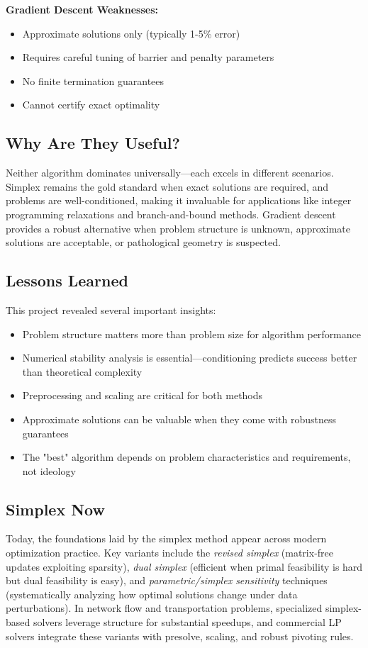 \documentclass[11pt]{article}
\begin{document}
\textbf{Gradient Descent Weaknesses:}
\begin{itemize}
    \item Approximate solutions only (typically 1-5\% error)
    \item Requires careful tuning of barrier and penalty parameters
    \item No finite termination guarantees
    \item Cannot certify exact optimality
\end{itemize}

\subsection{Why Are They Useful?}
Neither algorithm dominates universally—each excels in different scenarios. Simplex remains the gold standard when exact solutions are required, and problems are well-conditioned, making it invaluable for applications like integer programming relaxations and branch-and-bound methods. Gradient descent provides a robust alternative when problem structure is unknown, approximate solutions are acceptable, or pathological geometry is suspected.



\subsection{Lessons Learned}
This project revealed several important insights:
\begin{itemize}
    \item Problem structure matters more than problem size for algorithm performance
    \item Numerical stability analysis is essential—conditioning predicts success better than theoretical complexity
    \item Preprocessing and scaling are critical for both methods
    \item Approximate solutions can be valuable when they come with robustness guarantees
    \item The "best" algorithm depends on problem characteristics and requirements, not ideology
\end{itemize}

\subsection{Simplex Now}
Today, the foundations laid by the simplex method appear across modern optimization practice. Key variants include the \emph{revised simplex} (matrix-free updates exploiting sparsity), \emph{dual simplex} (efficient when primal feasibility is hard but dual feasibility is easy), and \emph{parametric/simplex sensitivity} techniques (systematically analyzing how optimal solutions change under data perturbations). In network flow and transportation problems, specialized simplex-based solvers leverage structure for substantial speedups, and commercial LP solvers integrate these variants with presolve, scaling, and robust pivoting rules.
\end{document}
